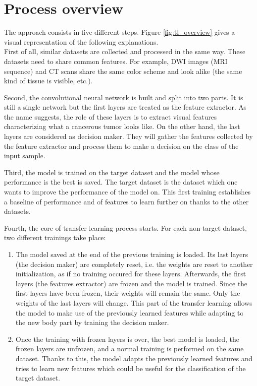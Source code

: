 \section{Process overview}
\label{sec:process_overview}
\setlength{\marginparwidth}{3cm}\leavevmode {}The approach consists in five different steps. Figure \ref{fig:tl_overview} gives a visual representation of the following explanations.\\
First of all, similar datasets are collected and processed in the same way. These datasets need to share common features. For example, DWI images (MRI sequence) and CT scans share the same color scheme and look alike (the same kind of tissue is visible, etc.). 

Second, the convolutional neural network is built and split into two parts. It is still a single network but the first layers are treated as the feature extractor. As the name suggests, the role of these layers is to extract visual features characterizing what a cancerous tumor looks like. On the other hand, the last layers are considered as decision maker. They will gather the features collected by the feature extractor and process them to make a decision on the class of the input sample. 

Third, the model is trained on the target dataset and the model whose performance is the best is saved. The target dataset is the dataset which one wants to improve the performance of the model on. This first training establishes a baseline of performance and of features to learn further on thanks to the other datasets. 

Fourth, the core of transfer learning process starts. For each non-target dataset, two different trainings take place:

\begin{enumerate}
	\item The model saved at the end of the previous training is loaded. Its last layers (the decision maker) are completely reset, i.e. the weights are reset to another initialization, as if no training occured for these layers. Afterwards, the first layers (the features extractor) are frozen and the model is trained. Since the first layers have been frozen, their weights will remain the same. Only the weights of the last layers will change. This part of the transfer learning allows the model to make use of the previously learned features while adapting to the new body part by training the decision maker. 
	\item Once the training with frozen layers is over, the best model is loaded, the frozen layers are unfrozen, and a normal training is performed on the same dataset. Thanks to this, the model adapts the previously learned features and tries to learn new features which could be useful for the classification of the target dataset. 
\end{enumerate}


